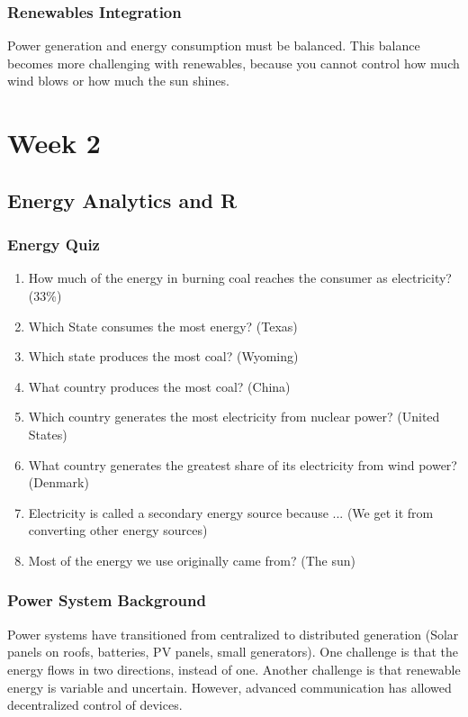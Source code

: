 \documentclass[12pt, a4paper]{report}
\begin{document}
  \section{Renewables Integration}
    Power generation and energy consumption must be balanced. This balance becomes more challenging with renewables, because you cannot control how much wind blows or how much the sun shines.





  \part{Week 2}

  \chapter{Energy Analytics and R}

  \section{Energy Quiz}

  \begin{enumerate}
    \item How much of the energy in burning coal reaches the consumer as electricity? (33\%)
    \item Which State consumes the most energy? (Texas)
    \item Which state produces the most coal? (Wyoming)
    \item What country produces the most coal? (China)
    \item Which country generates the most electricity from nuclear power? (United States)
    \item What country generates the greatest share of its electricity from wind power? (Denmark)
    \item Electricity is called a secondary energy source because ... (We get it from converting other energy sources)
    \item Most of the energy we use originally came from? (The sun)
  \end{enumerate}

  \section{Power System Background}

  Power systems have transitioned from centralized to distributed generation (Solar panels on roofs, batteries, PV panels, small generators). One challenge is that the energy flows in two directions, instead of one. Another challenge is that renewable energy is variable and uncertain. However, advanced communication has allowed decentralized control of devices.
\end{document}
